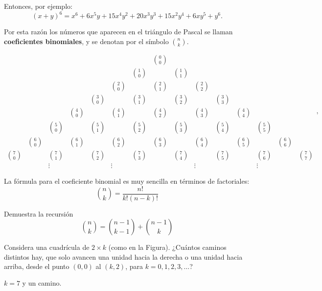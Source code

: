 Entonces, por ejemplo: $$(x+y)^6=x^6+6x^5y+15x^4y^2+20x^3y^3+15x^2 y^4+6xy^5+y^6.$$

Por esta razón los números que aparecen en el triángulo de Pascal se llaman {\bf coeficientes binomiales}, y se denotan por el símbolo ${n \choose k}$.

$$\begin{array}{ccccccccccccccc}
     &&&&&&& {0 \choose 0} &&&&&&&  \\
    &&&&&& {1 \choose 0} && {1 \choose 1} &&&&&& \\
   &&&&& {2 \choose 0} && {2 \choose 1} && {2 \choose 2} &&&&& \\
  &&&& {3 \choose 0} && {3 \choose 1} && {3 \choose 2} && {3 \choose 3} &&&& \\
 &&& {4 \choose 0} && {4 \choose 1} && {4 \choose 2} && {4 \choose 3} && {4 \choose 4} &&& \\
&& {5 \choose 0} && {5 \choose 1} && {5 \choose 2} && {5 \choose 3} && {5 \choose 4} && {5 \choose 5} &&\\
& {6 \choose 0} && {6 \choose 1} && {6 \choose 2} && {6 \choose 3} && {6 \choose 4} && {6 \choose 5} && {6 \choose 6} &\\
{7 \choose 0} && {7 \choose 1} && {7 \choose 2} && {7 \choose 3} && {7 \choose 4} && {7 \choose 5} && {7 \choose 6} && {7 \choose 7}\\
&& \vdots && &\vdots && && \vdots &&& \vdots
\end{array},$$

La fórmula para el coeficiente binomial es muy sencilla en términos de factoriales:
$${n \choose k}=\frac{n!}{k!(n-k)!}$$

\begin{ejercicio} Demuestra la recursión
$${n \choose k}={n-1 \choose k-1}+{n-1\choose k}$$
\end{ejercicio}

\begin{ejercicio} Considera una cuadrícula de $2\times k$ (como en la Figura).
¿Cuántos caminos distintos hay, que solo avancen una unidad hacia la derecha o una unidad hacia arriba, desde el punto $(0,0)$ al $(k,2)$, para $k=0,1,2,3,\dots$?
\end{ejercicio}

\begin{center}

  $k=7$ y un camino.
\end{center}

